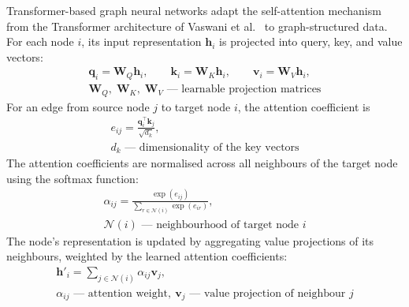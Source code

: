Transformer-based graph neural networks adapt the self-attention mechanism
from the Transformer architecture of Vaswani et al.~\cite{vaswani2017attention} to
graph-structured data.
For each node $i$, its input representation $\mathbf{h}_i$ is projected into
query, key, and value vectors:
\begin{equation}
\label{eq:transformer-qkv}
\begin{gathered}
\mathbf{q}_i = \mathbf{W}_{Q}\mathbf{h}_i, \qquad
\mathbf{k}_i = \mathbf{W}_{K}\mathbf{h}_i, \qquad
\mathbf{v}_i = \mathbf{W}_{V}\mathbf{h}_i, \\[0.4em]
{\scriptstyle
\mathbf{W}_{Q},\;\mathbf{W}_{K},\;\mathbf{W}_{V}\text{ --- learnable projection matrices}
}
\end{gathered}
\end{equation}
For an edge from source node $j$ to target node $i$, the attention
coefficient is
\begin{equation}
\begin{gathered}
e_{ij} =
\frac{\mathbf{q}_{i}^{\top}\mathbf{k}_{j}}{\sqrt{d_k}}, \\[0.4em]
{\scriptstyle
d_k\text{ --- dimensionality of the key vectors}
}
\end{gathered}
\end{equation}
The attention coefficients are normalised across all neighbours of the
target node using the softmax function:
\begin{equation}
\label{eq:transformer-softmax}
\begin{gathered}
\alpha_{ij} =
\frac{\exp(e_{ij})}
{\sum_{r \in \mathcal{N}(i)} \exp(e_{ir})}, \\[0.4em]
{\scriptstyle
\mathcal{N}(i)\text{ --- neighbourhood of target node }i
}
\end{gathered}
\end{equation}
The node's representation is updated by aggregating value projections of
its neighbours, weighted by the learned attention coefficients:
\begin{equation}
\begin{gathered}
\mathbf{h}'_i =
\sum_{j \in \mathcal{N}(i)}
\alpha_{ij}\mathbf{v}_{j}, \\[0.4em]
{\scriptstyle
\alpha_{ij}\text{ --- attention weight},\ 
\mathbf{v}_{j}\text{ --- value projection of neighbour }j
}
\end{gathered}
\end{equation}

